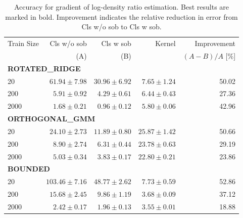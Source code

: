 \documentclass[11pt]{article}
\theoremstyle{plain}
\theoremstyle{definition}
\theoremstyle{remark}
\begin{document}
\begin{table}[htbp]
\centering
\caption{Accuracy for gradient of log-density ratio estimation. Best results are marked in bold. Improvement indicates the relative reduction in error from Cls w/o sob to Cls w sob.}
\label{tab:grouped_results_bold}
\begin{tabular}{lrrrr}
\toprule
Train Size & Cls w/o sob & Cls w sob & Kernel & Improvement \\
           & (A)           & (B)     &        & $(A-B)/A$ [\%] \\
\midrule
\multicolumn{5}{l}{\textbf{ROTATED\_RIDGE}} \\
20   & $61.94 \pm 7.98$ & $30.96 \pm 6.92$ & $\mathbf{7.65 \pm 1.24}$ & 50.02 \\
200  & $5.91 \pm 0.92$  & $\mathbf{4.29 \pm 0.61}$  & $6.44 \pm 0.43$ & 27.36 \\
2000 & $1.68 \pm 0.21$  & $\mathbf{0.96 \pm 0.12}$  & $5.80 \pm 0.06$ & 42.96 \\
\midrule
\multicolumn{5}{l}{\textbf{ORTHOGONAL\_GMM}} \\
20   & $24.10 \pm 2.73$ & $\mathbf{11.89 \pm 0.80}$ & $25.87 \pm 1.42$ & 50.66 \\
200  & $8.90 \pm 2.74$  & $\mathbf{6.31 \pm 0.44}$  & $23.78 \pm 0.63$ & 29.19 \\
2000 & $5.03 \pm 0.34$  & $\mathbf{3.83 \pm 0.17}$  & $22.80 \pm 0.21$ & 23.86 \\
\midrule
\multicolumn{5}{l}{\textbf{BOUNDED}} \\
20   & $103.46 \pm 7.16$ & $48.77 \pm 2.62$ & $\mathbf{7.73 \pm 0.59}$ & 52.86 \\
200  & $15.68 \pm 2.45$  & $9.86 \pm 1.19$  & $\mathbf{3.68 \pm 0.09}$ & 37.12 \\
2000 & $2.42 \pm 0.17$   & $\mathbf{1.96 \pm 0.13}$  & $3.55 \pm 0.01$ & 18.88 \\
\bottomrule
\end{tabular}
\end{table}
\end{document}
